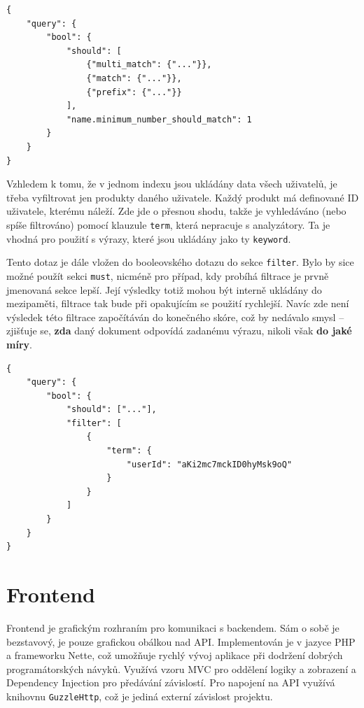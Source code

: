\documentclass[FM,DP]{tulthesis}
\newenvironment{code}
    {\filbreak\captionsetup{type=listing}}{\filbreak}
\begin{document}
\begin{code}
\captionsetup{singlelinecheck=false,justification=raggedright}
\label{code:es-search-4}
\begin{verbatim}
{
    "query": {
        "bool": {
            "should": [
                {"multi_match": {"..."}},
                {"match": {"..."}},
                {"prefix": {"..."}}
            ],
            "name.minimum_number_should_match": 1
        }
    }
}
\end{verbatim}
\end{code}

Vzhledem k tomu, že v jednom indexu jsou ukládány data všech uživatelů, je třeba vyfiltrovat
jen produkty daného uživatele. Každý produkt má definované ID uživatele, kterému náleží. 
Zde jde o přesnou shodu, takže je vyhledáváno (nebo spíše filtrováno) pomocí klauzule
\verb|term|, která nepracuje s analyzátory. Ta je vhodná pro použití s výrazy, které
jsou ukládány jako ty \verb|keyword|.

Tento dotaz je dále vložen do booleovského dotazu do sekce \verb|filter|. Bylo by sice 
možné použít sekci \verb|must|, nicméně pro případ, kdy probíhá filtrace je prvně 
jmenovaná sekce lepší. Její výsledky totiž mohou být interně ukládány do mezipaměti, 
filtrace tak bude při opakujícím se použití rychlejší. Navíc zde není výsledek
této filtrace započítáván do konečného skóre, což by nedávalo smysl -- zjišťuje se, 
\textbf{zda} daný dokument odpovídá zadanému výrazu, nikoli však \textbf{do jaké míry}.

\begin{code}
\captionsetup{singlelinecheck=false,justification=raggedright}
\label{code:es-filter}
\begin{verbatim}
{
    "query": {
        "bool": {
            "should": ["..."],
            "filter": [
                {
                    "term": {
                        "userId": "aKi2mc7mckID0hyMsk9oQ"
                    }
                }
            ]
        }
    }
}
\end{verbatim}
\end{code}

\section{Frontend}

Frontend je grafickým rozhraním pro komunikaci s backendem. Sám o sobě je bezstavový, je pouze
grafickou obálkou nad API. Implementován je v jazyce PHP a frameworku Nette, což umožňuje rychlý
vývoj aplikace při dodržení dobrých programátorských návyků. Využívá vzoru MVC pro oddělení logiky
a zobrazení a Dependency Injection pro předávání závislostí. Pro napojení na API využívá knihovnu 
\verb|GuzzleHttp|, což je jediná externí závislost projektu.
\end{document}
